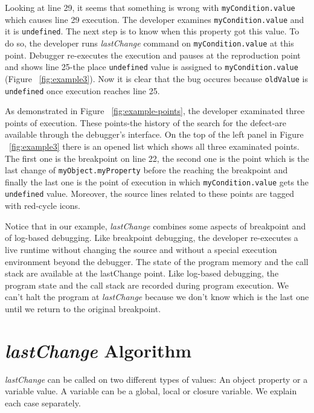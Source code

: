 \documentclass[preprint]{sigplanconf}
\begin{document}
Looking at line 29, it seems that something is wrong with \texttt{myCondition.value} which causes line 29 execution. The developer examines \texttt{myCondition.value} and it is \texttt{undefined}. The next step is to know when this property got this value. To do so, the developer runs \textit{lastChange} command on \texttt{myCondition.value} at this point. Debugger re-executes the execution and pauses at the reproduction point and shows line 25-the place \texttt{undefined} value is assigned to \texttt{myCondition.value} (Figure ~\ref{fig:example3}). Now it is clear that the bug occures because \texttt{oldValue} is \texttt{undefined} once execution reaches line 25.

As demonstrated in Figure ~\ref{fig:example-points}, the developer examinated three points of execution. These points-the history of the search for the defect-are available through the debugger's interface. On the top of the left panel in Figure ~\ref{fig:example3} there is an opened list which shows all three examinated points. The first one is the breakpoint on line 22, the second one is the point which is the last change of \texttt{myObject.myProperty} before the reaching the breakpoint and finally the last one is the point of execution in which \texttt{myCondition.value} gets the \texttt{undefined} value. Moreover, the source lines related to these points are tagged with red-cycle icons.

Notice that in our example, \textit{lastChange} combines some aspects of breakpoint and of log-based debugging. Like breakpoint debugging, the developer re-executes a live runtime without changing the source and without a special execution environment beyond the debugger. The state of the program memory and the call stack are available at the lastChange point. Like log-based debugging, the program state and the call stack are recorded during program execution. We can't halt the program at \textit{lastChange} because we don't know which is the last one until we return to the original breakpoint.

\section{\textit{lastChange} Algorithm}
\textit{lastChange} can be called on two different types of values: An object property or a variable value. A variable can be a global, local or closure variable. We explain each case separately.
\end{document}

